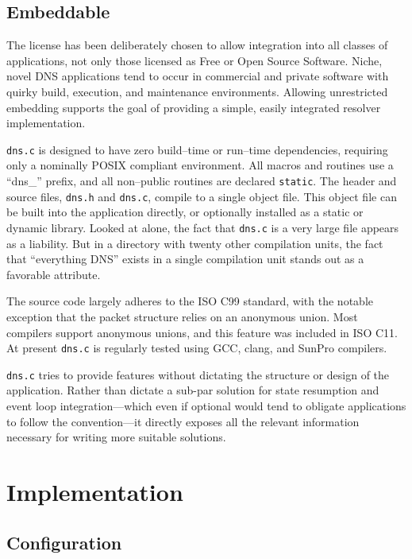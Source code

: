 \documentclass[11pt, oneside]{memoir}
\newcommand*{\dnsc}[0]{\texttt{dns.c}\xspace}
\newcommand*{\key}[1]{#1\index{#1}\xspace}
\begin{document}
\section{Embeddable}

The license has been deliberately chosen to allow integration into all classes of applications, not only those licensed as Free or Open Source Software. Niche, novel DNS applications tend to occur in commercial and private software with quirky build, execution, and maintenance environments. Allowing unrestricted embedding supports the goal of providing a simple, easily integrated resolver implementation.

\dnsc is designed to have zero build--time or run--time dependencies, requiring only a nominally \textsc{POSIX} compliant environment. All macros and routines use a ``dns\_'' prefix, and all non--public routines are declared \texttt{static}. The header and source files, \texttt{dns.h} and \texttt{dns.c}, compile to a single object file. This object file can be built into the application directly, or optionally installed as a static or dynamic library. Looked at alone, the fact  that \texttt{dns.c} is a very large file appears as a liability. But in a directory with twenty other compilation units, the fact that ``everything DNS'' exists in a single compilation unit stands out as a favorable attribute.

The source code largely adheres to the ISO \key{C99} standard, with the notable exception that the packet structure relies on an anonymous union. Most compilers support anonymous unions, and this feature was included in ISO \key{C11}. At present \dnsc is regularly tested using \key{GCC}, \key{clang}, and \key{SunPro} compilers.

\dnsc tries to provide features without dictating the structure or design of the application. Rather than dictate a sub-par solution for state resumption and event loop integration---which even if optional would tend to obligate applications to follow the convention---it directly exposes all the relevant information necessary for writing more suitable solutions.


\chapter{Implementation}

\section{Configuration}
\end{document}
